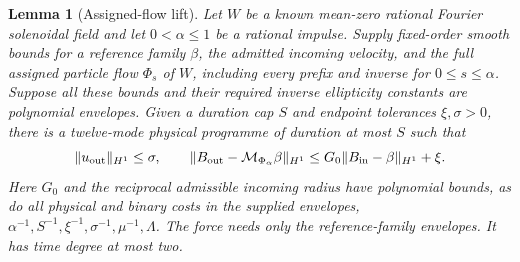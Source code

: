\documentclass[11pt,a4paper]{amsart}
\newtheorem{lemma}[theorem]{Lemma}
\theoremstyle{definition}
\theoremstyle{remark}
\numberwithin{equation}{section}
\newcommand{\Mcal}{\mathcal M}
\newcommand{\norm}[1]{\lVert #1\rVert}
\begin{document}
\begin{lemma}[Assigned-flow lift]\label{lem:assigned-lift}
Let $W$ be a known mean-zero rational Fourier solenoidal field and let
$0<\alpha\le1$ be a rational impulse.  Supply fixed-order smooth bounds for
a reference family $\beta$, the admitted incoming velocity, and the full
assigned particle flow $\Phi_s$ of $W$, including every prefix and inverse
for $0\le s\le\alpha$.  Suppose all these bounds and their required inverse
ellipticity constants are polynomial envelopes.  Given a duration cap $S$
and endpoint tolerances $\xi,\sigma>0$, there is a twelve-mode physical
programme of duration at most $S$ such that
\begin{equation}\label{eq:assigned-lift-contract}
 \norm{u_{\rm out}}_{H^1}\le\sigma,\qquad
 \norm{B_{\rm out}-\Mcal_{\Phi_\alpha}\beta}_{H^1}
       \le G_0\norm{B_{\rm in}-\beta}_{H^1}+\xi.
\end{equation}
Here $G_0$ and the reciprocal admissible incoming radius have polynomial
bounds, as do all physical and binary costs in the supplied envelopes,
$\alpha^{-1},S^{-1},\xi^{-1},\sigma^{-1},\mu^{-1},\Lambda$.  The force
needs only the reference-family envelopes.  It has time degree at most two.
\end{lemma}
\end{document}
